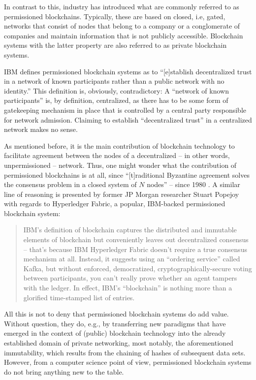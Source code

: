 In contrast to this, industry has introduced what are commonly referred to as permissioned blockchains.
Typically, these are based on closed, i.e, gated, networks that consist of nodes that belong to a company or a conglomerate of companies and maintain information that is not publicly accessible.
Blockchain systems with the latter property are also referred to as private blockchain systems.

IBM defines permissioned blockchain systems as to ``[e]stablish decentralized trust in a network of known participants rather than a public network with no identity.'' \autocite{ibm2020}
This definition is, obviously, contradictory:
A ``network of known participants'' is, by definition, centralized, as there has to be some form of gatekeeping mechanism in place that is controlled by a central party responsible for network admission.
Claiming to establish ``decentralized trust'' in a centralized network makes no sense.

As mentioned before, it is the main contribution of blockchain technology to facilitate agreement between the nodes of a decentralized -- in other words, unpermissioned -- network.
Thus, one might wonder what the contribution of permissioned blockchains is at all, since ``[t]raditional Byzantine agreement solves the consensus problem in a closed system of \(N\) nodes'' \autocite[1]{mazieres2019simplescp} -- since 1980 \autocite{lamport1980}.
A similar line of reasoning is presented by former JP Morgan researcher Stuart Popejoy with regards to Hyperledger Fabric, a popular, IBM-backed permissioned blockchain system: \autocite{popejoy2019}

\begin{quote}
  IBM's definition of blockchain captures the distributed and immutable elements of blockchain but conveniently leaves out decentralized consensus -- that's because IBM Hyperledger Fabric doesn't require a true consensus mechanism at all.
  Instead, it suggests using an ``ordering service'' called Kafka, but without enforced, democratized, cryptographically-secure voting between participants, you can’t really prove whether an agent tampers with the ledger. In effect, IBM’s ``blockchain'' is nothing more than a glorified time-stamped list of entries.
\end{quote}

All this is not to deny that permissioned blockchain systems do add value.
Without question, they do, e.g., by transferring new paradigms that have emerged in the context of (public) blockchain technology into the already established domain of private networking, most notably, the aforementioned immutability, which results from the chaining of hashes of subsequent data sets.
However, from a computer science point of view, permissioned blockchain systems do not bring anything new to the table.

